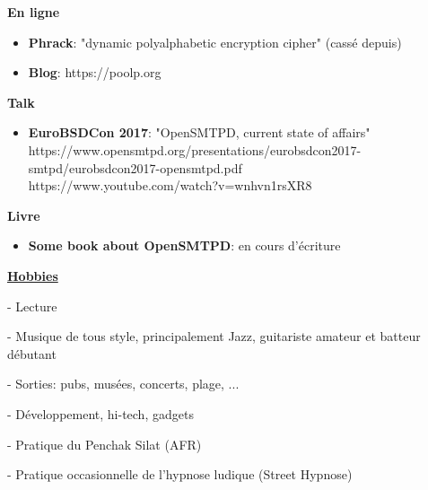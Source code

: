 \documentclass[a4paper,10pt]{letter}
\begin{document}
		\textbf{En ligne}
		\begin{itemize}
			\item	\textbf{Phrack}: "dynamic polyalphabetic encryption cipher" (cass\'e depuis)
			\item	\textbf{Blog}: https://poolp.org\\
		\end{itemize}

		\textbf{Talk}
		\begin{itemize}
			\item	\textbf{EuroBSDCon 2017}: "OpenSMTPD, current state of affairs"\\
			https://www.opensmtpd.org/presentations/eurobsdcon2017-smtpd/eurobsdcon2017-opensmtpd.pdf\\
			https://www.youtube.com/watch?v=wnhvn1rsXR8\\
		\end{itemize}


		\textbf{Livre}
		\begin{itemize}
			\item	\textbf{Some book about OpenSMTPD}: en cours d'\'ecriture\\
		\end{itemize}


	\underline{\textbf{Hobbies}}\\
		\begin{description}
			\item - Lecture
			\item - Musique de tous style, principalement Jazz, guitariste amateur et batteur d\'ebutant
			\item - Sorties: pubs, mus\'ees, concerts, plage, ...
			\item - D\'eveloppement, hi-tech, gadgets
			\item - Pratique du Penchak Silat (AFR)
			\item - Pratique occasionnelle de l'hypnose ludique (Street Hypnose)\\
		\end{description}
\end{document}

